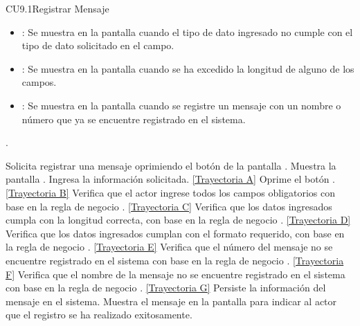 \begin{UseCase}{CU9.1}{Registrar Mensaje}
{\begin{itemize}
		\item {}: Se muestra en la pantalla  cuando el tipo de dato ingresado no cumple con el tipo de dato solicitado en el campo.
		\item {}: Se muestra en la pantalla  cuando se ha excedido la longitud de alguno de los campos.
		\item {}: Se muestra en la pantalla  cuando se registre un mensaje con un nombre o número que ya se encuentre registrado en el sistema.
		\end{itemize}.
		}
	\end{UseCase}
	\begin{UCtrayectoria}
		\UCpaso[\UCactor] Solicita registrar una mensaje oprimiendo el botón  de la pantalla .
		\UCpaso[\UCsist] Muestra la pantalla .
		\UCpaso[\UCactor] Ingresa la información solicitada. \label{CU9.1-P3} \hyperlink{CU9-1:TAA}{[Trayectoria A]}
		\UCpaso[\UCactor] Oprime el botón  . \label{CU9.1-P4} \hyperlink{CU9-1:TAB}{[Trayectoria B]} 
		\UCpaso[\UCsist] Verifica que el actor ingrese todos los campos obligatorios con base en la regla de negocio . \hyperlink{CU9-1:TAC}{[Trayectoria C]}
		\UCpaso[\UCsist] Verifica que los datos ingresados cumpla con la longitud correcta, con base en la regla de negocio . \hyperlink{CU9-1:TAD}{[Trayectoria D]}
		\UCpaso[\UCsist] Verifica que los datos ingresados cumplan con el formato requerido, con base en la regla de negocio . \hyperlink{CU9-1:TAE}{[Trayectoria E]}
		\UCpaso[\UCsist] Verifica que el número del mensaje no se encuentre registrado en el sistema con base en la regla de negocio . \hyperlink{CU9-1:TAF}{[Trayectoria F]}
		\UCpaso[\UCsist] Verifica que el nombre de la mensaje no se encuentre registrado en el sistema con base en la regla de negocio . \hyperlink{CU9-1:TAG}{[Trayectoria G]} 
		\UCpaso[\UCsist] Persiste la información del mensaje en el sistema.
		\UCpaso[\UCsist] Muestra el mensaje  en la pantalla  para indicar al actor que el registro se ha realizado exitosamente.
	\end{UCtrayectoria}		
